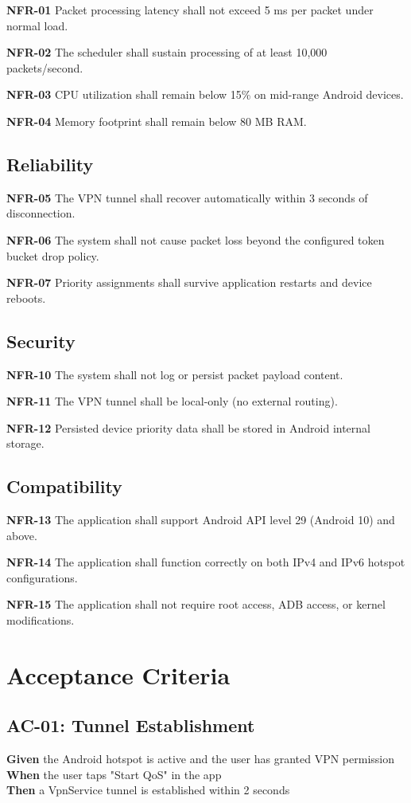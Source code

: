 \textbf{NFR-01} Packet processing latency shall not exceed 5 ms per packet under normal load.

\textbf{NFR-02} The scheduler shall sustain processing of at least 10,000 packets/second.

\textbf{NFR-03} CPU utilization shall remain below 15\% on mid-range Android devices.

\textbf{NFR-04} Memory footprint shall remain below 80 MB RAM.

\subsection{Reliability}

\textbf{NFR-05} The VPN tunnel shall recover automatically within 3 seconds of disconnection.

\textbf{NFR-06} The system shall not cause packet loss beyond the configured token bucket drop policy.

\textbf{NFR-07} Priority assignments shall survive application restarts and device reboots.

\subsection{Security}

\textbf{NFR-10} The system shall not log or persist packet payload content.

\textbf{NFR-11} The VPN tunnel shall be local-only (no external routing).

\textbf{NFR-12} Persisted device priority data shall be stored in Android internal storage.

\subsection{Compatibility}

\textbf{NFR-13} The application shall support Android API level 29 (Android 10) and above.

\textbf{NFR-14} The application shall function correctly on both IPv4 and IPv6 hotspot configurations.

\textbf{NFR-15} The application shall not require root access, ADB access, or kernel modifications.

\section{Acceptance Criteria}

\subsection{AC-01: Tunnel Establishment}
\textbf{Given} the Android hotspot is active and the user has granted VPN permission\\
\textbf{When} the user taps "Start QoS" in the app\\
\textbf{Then} a VpnService tunnel is established within 2 seconds

